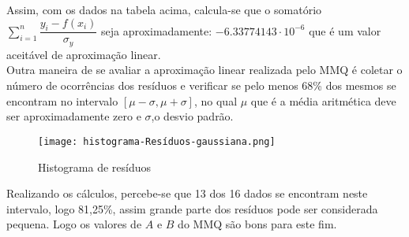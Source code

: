 \documentclass[a4paper, 12pt]{article}
\begin{document}
		\noindent Assim, com os dados na tabela acima, calcula-se que o somatório $\displaystyle\sum\limits_{i=1}^n\dfrac{y_i - f(x_i)}{\sigma_y}$ seja aproximadamente: $-6.33774143 \cdot 10^{-6}$ que é um valor aceitável de aproximação linear. \\
		\noindent Outra maneira de se avaliar a aproximação linear realizada pelo MMQ é coletar o número de ocorrências dos resíduos e verificar se pelo menos 68\% dos mesmos se encontram no intervalo $[\mu-\sigma, \mu+\sigma]$, no qual $\mu$ que é a média aritmética  deve ser aproximadamente zero e $\sigma$,o desvio padrão. 
		\begin{figure}[H]
			\centering
			\texttt{[image: histograma-Resíduos-gaussiana.png]}
			\caption{Histograma de resíduos}
			\label{g1}
		\end{figure}
		\newpage
		\noindent Realizando os cálculos, percebe-se que 13 dos 16 dados se encontram neste intervalo, logo  81,25\%, assim grande parte dos resíduos pode ser considerada pequena. Logo os valores de $A$ e $B$ do MMQ são bons para este fim.
\end{document}
